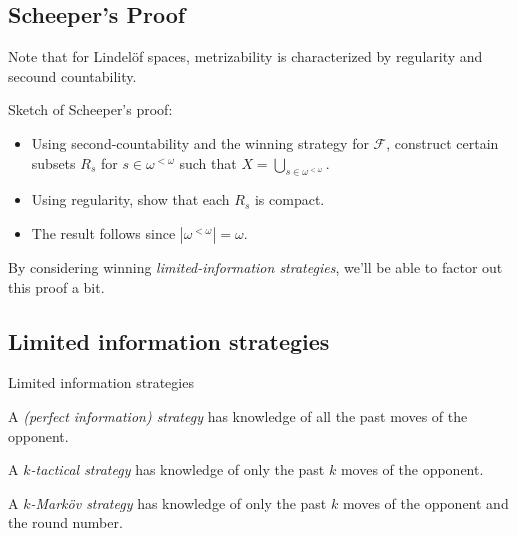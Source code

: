 \documentclass{beamer}
\theoremstyle{definition}
\newcommand{\<}{\langle}
\renewcommand{\>}{\rangle}
\newcommand{\pl}[1]{\mathscr{#1}}
\newcommand{\term}{\textit}
\begin{document}
\subsection{Scheeper's Proof}

\begin{frame}
  Note that for Lindel\"of spaces, metrizability is characterized by regularity
  and secound countability.

  \vpause

  Sketch of Scheeper's proof:
  \begin{itemize}
    \item Using second-countability and the winning strategy for $\pl F$,
          construct certain subsets $R_s$ for $s \in \omega^{<\omega}$ such
          that $X = \bigcup_{s\in\omega^{<\omega}}$.
    \item Using regularity, show that each $R_s$ is compact.
    \item The result follows since $|\omega^{<\omega}|=\omega$.
  \end{itemize}

  \vpause

  By considering winning \term{limited-information strategies}, we'll be able
  to factor out this proof a bit.
\end{frame}

\subsection{Limited information strategies}

\begin{frame}{Limited information strategies}
  \begin{definition}
    A \term{(perfect information) strategy} has knowledge of all the past
    moves of the opponent.
  \end{definition}

  \pause

  \begin{definition}
    A \term{$k$-tactical strategy} has knowledge of only the past $k$
    moves of the opponent.
  \end{definition}

  \pause

  \begin{definition}
    A \term{$k$-Mark\"ov strategy} has knowledge of only the past $k$
    moves of the opponent and the round number.
  \end{definition}
\end{frame}
\end{document}

